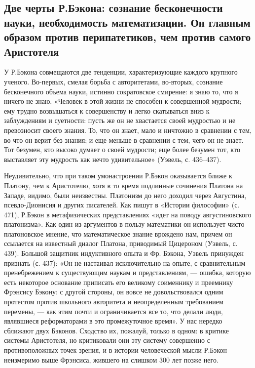 \subsection{Две   черты   Р.Бэкона:  сознание   бесконечности   науки,
необходимость математизации. Он  главным образом против перипатетиков,
чем против самого Аристотеля}

У Р.Бэкона совмещаются две тенденции, характеризующие каждого крупного
ученого. Во-первых, смелая борьба  с авторитетами, во-вторых, сознание
бесконечного объема  науки, истинно сократовское смирение:  я знаю то,
что я ничего не знаю. «Человек  в этой жизни не способен к совершенной
мудрости; ему  трудно возвышаться  к совершенству и  легко скатываться
вниз  к заблуждениям  и суетности:  пусть  же он  не хвастается  своей
мудростью и  не превозносит своего  знания. То,  что он знает,  мало и
ничтожно в сравнении с тем, во что он верит без знания; и еще меньше в
сравнении с  тем, чего он не  знает. Тот безумен, кто  высоко думает о
своей мудрости; еще более безумен тот, кто выставляет эту мудрость как
нечто удивительное» (Уэвель, с. 436--437).

Неудивительно, что при таком умонастроении Р.Бэкон оказывается ближе к
Платону, чем к Аристотелю, хотя в то время подлинные сочинения Платона
на Западе,  видимо, были неизвестны.  Платонизм до него  доходил через
Августина, псевдо-Дионисия  и других  писателей. Как пишут  в «Истории
философии» (с. 471), Р.Бэкон  в метафизических представлениях «идет на
поводу августиновского  платонизма». Как  один из аргументов  в пользу
математики он использует чисто платоновское мнение, что математическое
знание врождено нам, причем он  ссылается на известный диалог Платона,
приводимый Цицероном  (Уэвель, с. 439). Большой  защитник индуктивного
опыта  и  Фр. Бэкона,  Уэвель  принужден  признать  (с. 437):  «Он  не
настаивал  исключительно  на  опыте,  с  сравнительным  пренебрежением
к  существующим  наукам и  представлениям,  ---  ошибка, которую  есть
некоторое  основание приписать  его  великому  соименнику и  преемнику
Фрэнсису Бэкону: с  другой стороны, он вовсе  не довольствовался одним
протестом  против школьного  авторитета  и неопределенным  требованием
перемены, --- как этим почти и ограничивается все то, что делали люди,
являвшиеся  реформаторами в  это промежуточное  время». У  нас нередко
сближают двух Бэконов. Сходство их, пожалуй, только в одном: в критике
системы  Аристотеля,  но  критиковали  они эту  систему  совершенно  с
противоположных точек  зрения, и в истории  человеческой мысли Р.Бэкон
неизмеримо выше Фрэнсиса, жившего на слишком 300 лет позже него.

